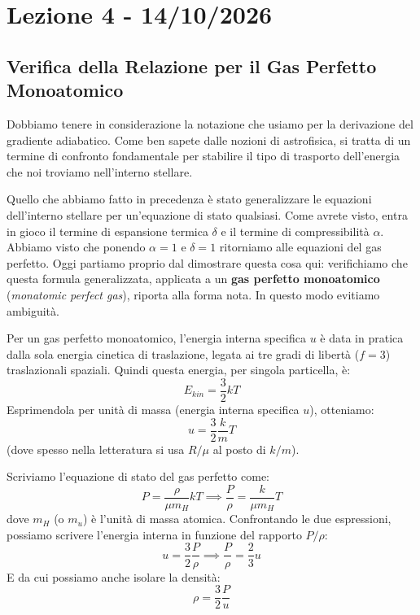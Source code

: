 \chapter{Lezione 4 - 14/10/2026}

\section{Verifica della Relazione per il Gas Perfetto Monoatomico}

Dobbiamo tenere in considerazione la notazione che usiamo per la derivazione del gradiente adiabatico. Come ben sapete dalle nozioni di astrofisica, si tratta di un termine di confronto fondamentale per stabilire il tipo di trasporto dell'energia che noi troviamo nell'interno stellare.

Quello che abbiamo fatto in precedenza è stato generalizzare le equazioni dell'interno stellare per un'equazione di stato qualsiasi. Come avrete visto, entra in gioco il termine di espansione termica $\delta$ e il termine di compressibilità $\alpha$.
Abbiamo visto che ponendo $\alpha = 1$ e $\delta = 1$ ritorniamo alle equazioni del gas perfetto. Oggi partiamo proprio dal dimostrare questa cosa qui: verifichiamo che questa formula generalizzata, applicata a un \textbf{gas perfetto monoatomico} (\textit{monatomic perfect gas}), riporta alla forma nota. In questo modo evitiamo ambiguità.

Per un gas perfetto monoatomico, l'energia interna specifica $u$ è data in pratica dalla sola energia cinetica di traslazione, legata ai tre gradi di libertà ($f=3$) traslazionali spaziali.
Quindi questa energia, per singola particella, è:
\begin{equation}
E_{kin} = \frac{3}{2} k T
\end{equation}
Esprimendola per unità di massa (energia interna specifica $u$), otteniamo:
\begin{equation}
u = \frac{3}{2} \frac{k}{m} T
\end{equation}
(dove spesso nella letteratura si usa $R/\mu$ al posto di $k/m$).

Scriviamo l'equazione di stato del gas perfetto come:
\begin{equation}
P = \frac{\rho}{\mu m_H} k T \implies \frac{P}{\rho} = \frac{k}{\mu m_H} T
\end{equation}
dove $m_H$ (o $m_u$) è l'unità di massa atomica.
Confrontando le due espressioni, possiamo scrivere l'energia interna in funzione del rapporto $P/\rho$:
\begin{equation}
u = \frac{3}{2} \frac{P}{\rho} \implies \frac{P}{\rho} = \frac{2}{3} u
\end{equation}
E da cui possiamo anche isolare la densità:
\begin{equation}
\rho = \frac{3}{2} \frac{P}{u}
\end{equation}

